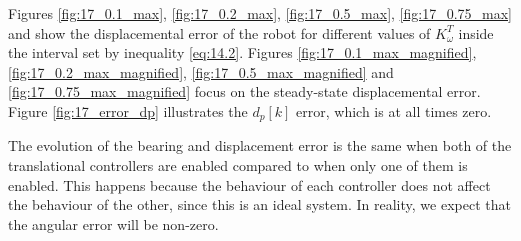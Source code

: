 Figures \ref{fig:17_0.1_max}, \ref{fig:17_0.2_max}, \ref{fig:17_0.5_max},
\ref{fig:17_0.75_max} and show the displacemental error of the
robot for different values of $K_{\omega}^T$ inside the interval set by
inequality \ref{eq:14.2}. Figures \ref{fig:17_0.1_max_magnified},
\ref{fig:17_0.2_max_magnified}, \ref{fig:17_0.5_max_magnified} and
\ref{fig:17_0.75_max_magnified} focus on the steady-state displacemental error.
Figure \ref{fig:17_error_dp} illustrates the $d_p[k]$ error, which is at all
times zero.

The evolution of the bearing and displacement error is the same when both of the
translational controllers are enabled compared to when only one of them is
enabled. This happens because the behaviour of each controller does not affect
the behaviour of the other, since this is an ideal system. In reality, we expect
that the angular error will be non-zero.

\noindent{}

\noindent{}

